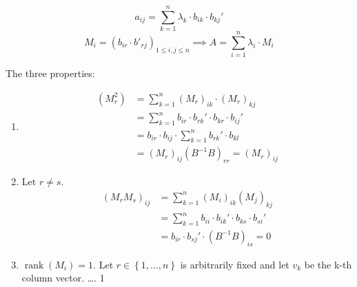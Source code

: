 \documentclass[a4paper]{article}
\theoremstyle{definition}
\newcommand\set[1]{\left\{#1\right\}}
\begin{document}
\[ a_{ij} = \sum_{k=1}^n \lambda_k \cdot b_{ik} \cdot b_{kj}' \]
\[ M_i = (b_{ir} \cdot b'_{rj})_{1 \leq i,j \leq n} \implies A = \sum_{i=1}^{n} \lambda_i \cdot M_i \]

The three properties:
\begin{enumerate}
  \item
    \begin{align*}
      (M_r^2) &= \sum_{k=1}^n (M_r)_{ik} \cdot (M_r)_{kj} \\
        &= \sum_{k=1}^n b_{ir} \cdot b_{rk}' \cdot b_{kr} \cdot b_{ij}' \\
        &= b_{ir} \cdot b_{ij} \cdot \sum_{k=1}^{n} b_{rk}' \cdot b_{kl} \\
        &= (M_r)_{ij} (B^{-1} B)_{rr} = (M_r)_{ij}
    \end{align*}
  \item Let $r \neq s$.
    \begin{align*}
      (M_r M_s)_{ij} &= \sum_{k=1}^n (M_i)_{ik} (M_j)_{kj} \\
        &= \sum_{k=1}^n b_{ii} \cdot b_{ik}' \cdot b_{ks} \cdot b_{si}' \\
        &= b_{ir} \cdot b_{sj}' \cdot (B^{-1} B)_{is} = 0
    \end{align*}
  \item $\operatorname{rank}(M_i) = 1$. Let $r \in \set{1, \dots, n}$ is arbitrarily fixed and let $v_k$ be the k-th column vector. \dots. 1
\end{enumerate}
\end{document}
